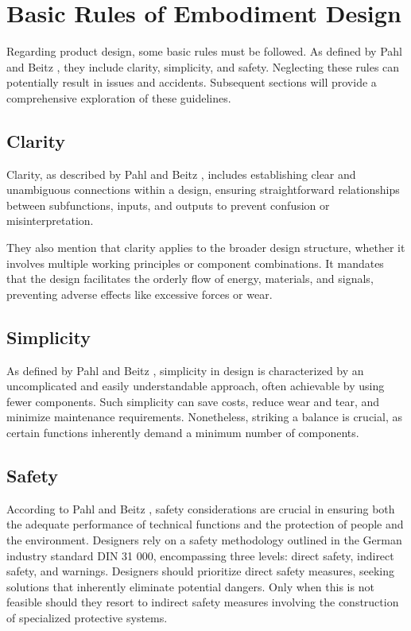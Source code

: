 \section{Basic Rules of Embodiment Design}
Regarding product design, some basic rules must be followed. As defined by Pahl and Beitz \cite[234-235]{Pahl2007}, they include clarity, simplicity, and safety. Neglecting these rules can potentially result in issues and accidents. Subsequent sections will provide a comprehensive exploration of these guidelines.

\subsection{Clarity}
Clarity, as described by Pahl and Beitz \cite[235]{Pahl2007}, includes establishing clear and unambiguous connections within a design, ensuring straightforward relationships between subfunctions, inputs, and outputs to prevent confusion or misinterpretation.

They also mention that clarity applies to the broader design structure, whether it involves multiple working principles or component combinations. It mandates that the design facilitates the orderly flow of energy, materials, and signals, preventing adverse effects like excessive forces or wear.

\subsection{Simplicity}
As defined by Pahl and Beitz \cite[242]{Pahl2007}, simplicity in design is characterized by an uncomplicated and easily understandable approach, often achievable by using fewer components. Such simplicity can save costs, reduce wear and tear, and minimize maintenance requirements. Nonetheless, striking a balance is crucial, as certain functions inherently demand a minimum number of components.

\subsection{Safety}
According to Pahl and Beitz \cite[247]{Pahl2007}, safety considerations are crucial in ensuring both the adequate performance of technical functions and the protection of people and the environment. Designers rely on a safety methodology outlined in the German industry standard DIN 31 000, encompassing three levels: direct safety, indirect safety, and warnings. Designers should prioritize direct safety measures, seeking solutions that inherently eliminate potential dangers. Only when this is not feasible should they resort to indirect safety measures involving the construction of specialized protective systems.

